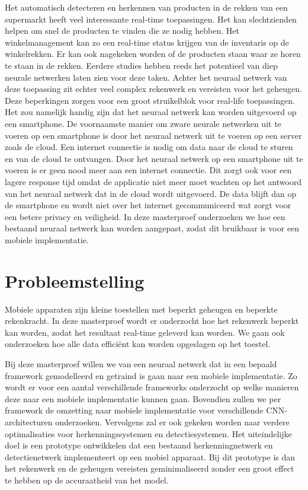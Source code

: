 Het automatisch detecteren en herkennen van producten in de rekken van een supermarkt heeft veel interessante real-time toepassingen.
Het kan slechtzienden helpen om snel de producten te vinden die ze nodig hebben. 
Het winkelmanagement kan zo een real-time status krijgen van de inventaris op de winkelrekken.
Er kan ook nagekeken worden of de producten staan waar ze horen te staan in de rekken.
Eerdere studies hebben reeds het potentieel van diep neurale netwerken laten zien voor deze taken.
Achter het neuraal netwerk van deze toepassing zit echter veel complex rekenwerk en vereisten voor het geheugen.
Deze beperkingen zorgen voor een groot struikelblok voor real-life toepassingen.
Het zou namelijk handig zijn dat het neuraal netwerk kan worden uitgevoerd op een smartphone.
De voornaamste manier om zware neurale netwerken uit te voeren op een smartphone is door het neuraal netwerk uit te voeren op een server zoals de cloud.
Een internet connectie is nodig om data naar de cloud te sturen en van de cloud te ontvangen.
Door het neuraal netwerk op een smartphone uit te voeren is er geen nood meer aan een internet connectie.
Dit zorgt ook voor een lagere response tijd omdat de applicatie niet meer moet wachten op het antwoord van het neuraal netwerk dat in de cloud wordt uitgevoerd.
De data blijft dan op de smartphone en wordt niet over het internet gecommuniceerd wat zorgt voor een betere privacy en veiligheid. 
In deze masterproef onderzoeken we hoe een bestaand neuraal netwerk kan worden aangepast, zodat dit bruikbaar is voor een mobiele implementatie.

\section{Probleemstelling}
Mobiele apparaten zijn kleine toestellen met beperkt geheugen en beperkte rekenkracht. 
In deze masterproef wordt er onderzocht hoe het rekenwerk beperkt kan worden, zodat het resultaat real-time geleverd kan worden. 
We gaan ook onderzoeken hoe alle data effici\"ent kan worden opgeslagen op het toestel. 

Bij deze masterproef willen we van een neuraal netwerk dat in een bepaald framework gemodelleerd en getraind is gaan naar een mobiele implementatie.
Zo wordt er voor een aantal verschillende frameworks onderzocht op welke manieren deze naar een mobiele implementatie kunnen gaan.
Bovendien zullen we per framework de omzetting naar mobiele implementatie voor verschillende CNN-architecturen onderzoeken. 
Vervolgens zal er ook gekeken worden naar verdere optimalisaties voor herkenningssystemen en detectiesystemen. 
Het uiteindelijke doel is een prototype ontwikkelen dat een bestaand herkenningnetwerk en detectienetwerk implementeert op een mobiel apparaat. 
Bij dit prototype is dan het rekenwerk en de geheugen vereisten geminimaliseerd zonder een groot effect te hebben op de accuraatheid van het model.

